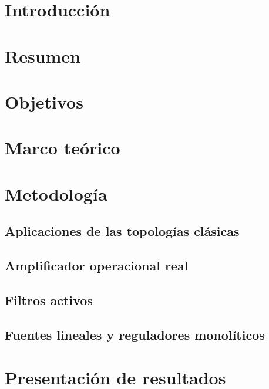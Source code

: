 \documentclass{article}
\begin{document}

\tableofcontents
\newpage
\section{Introducción}


\section{Resumen}


\section{Objetivos}


\section {Marco teórico}





\section{Metodología}
\subsection{Aplicaciones de las topologías clásicas}

\FloatBarrier
\subsection{Amplificador operacional real}

\FloatBarrier
\subsection{Filtros activos}

\FloatBarrier
\subsection{Fuentes lineales y reguladores monolíticos}




\section{Presentación de resultados}
\end{document}
